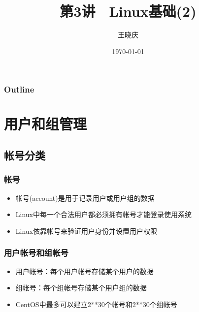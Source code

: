 \documentclass[xcolor=svgnames,presentation]{beamer}
\title{第3讲　Linux基础(2)}
\author{王晓庆}
\date{\today}
\institute{wangxiaoqing@outlook.com}
\begin{document}
\maketitle

\begin{frame}
\frametitle{Outline}
\setcounter{tocdepth}{1}
\tableofcontents
\end{frame}

\section{用户和组管理}
\label{sec-1}
\subsection{帐号分类}
\label{sec-1-1}
\begin{frame}
\frametitle{帐号}
\label{sec-1-1-1}
\begin{itemize}

\item 帐号(account)是用于记录用户或用户组的数据
\label{sec-1-1-1-1}%

\item Linux中每一个合法用户都必须拥有帐号才能登录使用系统
\label{sec-1-1-1-2}%

\item Linux依靠帐号来验证用户身份并设置用户权限
\label{sec-1-1-1-3}%
\end{itemize} %
\end{frame}
\begin{frame}
\frametitle{用户帐号和组帐号}
\label{sec-1-1-2}
\begin{itemize}

\item 用户帐号：每个用户帐号存储某个用户的数据
\label{sec-1-1-2-1}%

\item 组帐号：每个组帐号存储某个用户组的数据
\label{sec-1-1-2-2}%

\item CentOS中最多可以建立2**30个帐号和2**30个组帐号
\label{sec-1-1-2-3}%
\end{itemize} %
\end{frame}
\end{document}
